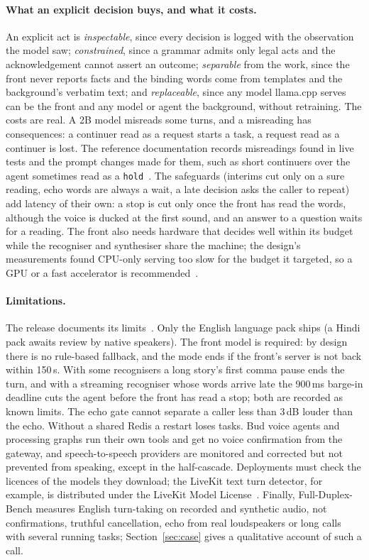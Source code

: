 \paragraph{What an explicit decision buys, and what it costs.}
An explicit act is \emph{inspectable}, since every decision is logged with the observation the model saw;
\emph{constrained}, since a grammar admits only legal acts and the acknowledgement cannot assert an outcome;
\emph{separable} from the work, since the front never reports facts and the binding words come from templates and
the background's verbatim text; and \emph{replaceable}, since any model llama.cpp serves can be the front and any
model or agent the background, without retraining. The costs are real. A 2B model misreads some turns, and a
misreading has consequences: a continuer read as a request starts a task, a request read as a continuer is lost.
The reference documentation records misreadings found in live tests and the prompt changes made for them, such as
short continuers over the agent sometimes read as a \texttt{hold}~\citep{waav_imdoc}. The safeguards (interims cut
only on a sure reading, echo words are always a wait, a late decision asks the caller to repeat) add latency of
their own: a stop is cut only once the front has read the words, although the voice is ducked at the first sound,
and an answer to a question waits for a reading. The front also needs hardware that decides well within its
budget while the recogniser and synthesiser share the machine; the design's measurements found CPU-only serving
too slow for the budget it targeted, so a GPU or a fast accelerator is recommended~\citep{waav_design}.

\paragraph{Limitations.}
The release documents its limits~\citep{waav_imdoc}. Only the English language pack ships (a Hindi pack awaits review by
native speakers). The front model is required: by design there is no rule-based fallback, and the mode ends if the front's
server is not back within 150\,s. With some recognisers a long story's first comma pause ends the turn, and with a streaming
recogniser whose words arrive late the 900\,ms barge-in deadline cuts the agent before the front has read a stop; both are
recorded as known limits. The echo gate cannot separate a caller less than 3\,dB louder than the echo. Without a shared Redis
a restart loses tasks. Bud voice agents and processing graphs run their own tools and get no voice confirmation from the
gateway, and speech-to-speech providers are monitored and corrected but not prevented from speaking, except in the
half-cascade. Deployments must check the licences of the models they download; the LiveKit text turn detector, for example,
is distributed under the LiveKit Model License~\citep{livekit_turndetector}. Finally, Full-Duplex-Bench measures English
turn-taking on recorded and synthetic audio, not confirmations, truthful cancellation, echo from real loudspeakers or long
calls with several running tasks; Section~\ref{sec:case} gives a qualitative account of such a call.

